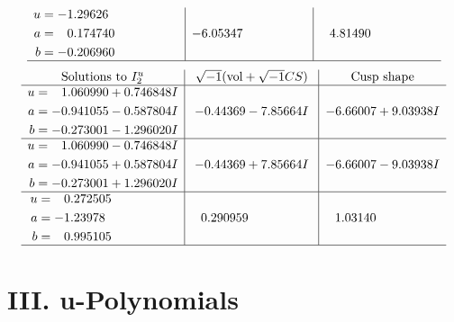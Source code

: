 \documentclass[1p]{elsarticle_modified}
\theoremstyle{definition}
\newcommand{\I}{\sqrt{-1}}
\begin{document}
$$\begin{array}{c|c|c}
\begin{aligned}
u &= -1.29626\phantom{ +0.000000I} \\
a &= \phantom{-}0.174740\phantom{ +0.000000I} \\
b &= -0.206960\phantom{ +0.000000I}\end{aligned}
 & -6.05347\phantom{ +0.000000I} & \phantom{-}4.81490\phantom{ +0.000000I}\\
 \hline 
 \end{array}$$\newpage$$\begin{array}{c|c|c}  
\text{Solutions to }I^u_{2}& \I (\text{vol} + \sqrt{-1}CS) & \text{Cusp shape}\\
 \hline 
\begin{aligned}
u &= \phantom{-}1.060990 + 0.746848 I \\
a &= -0.941055 - 0.587804 I \\
b &= -0.273001 - 1.296020 I\end{aligned}
 & -0.44369 - 7.85664 I & -6.66007 + 9.03938 I \\ \hline\begin{aligned}
u &= \phantom{-}1.060990 - 0.746848 I \\
a &= -0.941055 + 0.587804 I \\
b &= -0.273001 + 1.296020 I\end{aligned}
 & -0.44369 + 7.85664 I & -6.66007 - 9.03938 I \\ \hline\begin{aligned}
u &= \phantom{-}0.272505\phantom{ +0.000000I} \\
a &= -1.23978\phantom{ +0.000000I} \\
b &= \phantom{-}0.995105\phantom{ +0.000000I}\end{aligned}
 & \phantom{-}0.290959\phantom{ +0.000000I} & \phantom{-}1.03140\phantom{ +0.000000I}\\
 \hline 
 \end{array}$$\newpage
\newpage\renewcommand{\arraystretch}{1}
\centering \section*{ III. u-Polynomials}
\end{document}
